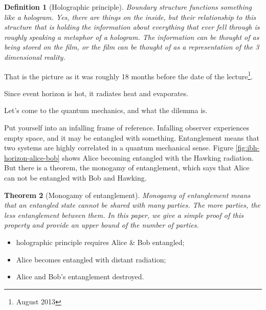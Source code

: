 \documentclass[]{article}
\newtheorem{thm}{Theorem}
\newtheorem{defn}[thm]{Definition}
\begin{document}
{\begin{appendices}
	\begin{defn}[Holographic principle]
		Boundary structure functions something like a hologram. Yes, there are things on the inside, but their relationship to this structure that is holding the information about everything that ever fell through is roughly speaking a metaphor of a hologram.  The information can be thought of as being stored on the film, or the film can be thought of as a representation of the 3 dimensional reality.
	\end{defn}

	That is the picture as it was roughly 18 months before the date of the lecture\footnote{August 2013}.
	
	Since event horizon is hot, it radiates heat and evaporates.
	
	Let's come to the quantum mechanics, and what the dilemma is.
	
	Put yourself into an infalling frame of reference. 	Infalling observer experiences empty space, and it may be entangled with something. Entanglement means that two systems are highly correlated in a quantum mechanical sense. Figure \ref{fig:ibh-horizon-alice-bob} shows Alice becoming entangled with the Hawking radiation. But there is a theorem, the monogamy of entanglement, which says that Alice can not be entangled with Bob and Hawking. 
	
	\begin{thm}[Monogamy of entanglement]
		Monogamy of entanglement means that an entangled state cannot be shared with many parties. The more parties, the less entanglement between them. In this paper, we give a simple proof of this property and provide an upper bound of the number of parties.\cite{Yang_2006} 
	\end{thm}

	\begin{itemize}
		\item holographic principle requires Alice \& Bob entangled;
		\item Alice becomes entangled with distant radiation;
		\item Alice and Bob's entanglement destroyed.
	\end{itemize}
	

\end{appendices}}
\end{document}
